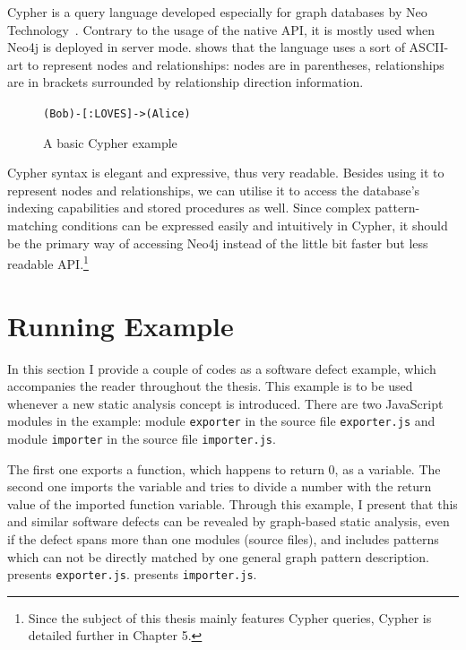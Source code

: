 Cypher is a query language developed especially for graph databases by Neo Technology~\cite{neo4j-cypher}. Contrary to the usage of the native API, it is mostly used when Neo4j is deployed in server mode.  shows that the language uses a sort of ASCII-art to represent nodes and relationships: nodes are in parentheses, relationships are in brackets surrounded by relationship direction information.

\begin{figure}[!htb]
	\centering
	\lstinline{(Bob)-[:LOVES]->(Alice)}
  \caption{A basic Cypher example}
	\label{fig:cypher-intro}
\end{figure}

Cypher syntax is elegant and expressive, thus very readable. Besides using it to represent nodes and relationships, we can utilise it to access the database's indexing capabilities and stored procedures as well. Since complex pattern-matching conditions can be expressed easily and intuitively in Cypher, it should be the primary way of accessing Neo4j instead of the little bit faster but less readable API.\footnote{Since the subject of this thesis mainly features Cypher queries, Cypher is detailed further in Chapter 5.}


\section{Running Example}

In this section I provide a couple of \es codes as a software defect example, which accompanies the reader throughout the thesis. This example is to be used whenever a new static analysis concept is introduced. There are two JavaScript modules in the example: module \lstinline{exporter} in the source file \lstinline{exporter.js} and module \lstinline{importer} in the source file \lstinline{importer.js}.

The first one exports a function, which happens to return $0$, as a variable. The second one imports the variable and tries to divide a number with the return value of the imported function variable. Through this example, I present that this and similar software defects can be revealed by graph-based static analysis, even if the defect spans more than one \es modules (source files), and includes patterns which can not be directly matched by one general graph pattern description.  presents \lstinline{exporter.js}.  presents \lstinline{importer.js}.

